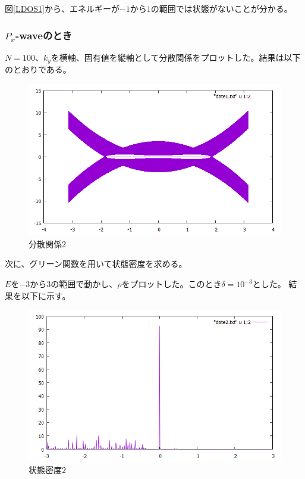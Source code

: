 \documentclass{jsarticle}
\begin{document}
            図\eqref{LDOS1}から、エネルギーが$-1$から$1$の範囲では状態がないことが分かる。
    
            \subsubsection{$P_x$-waveのとき}
            $N=100$、$k_y$を横軸、固有値を縦軸として分散関係をプロットした。結果は以下のとおりである。
    
            \begin{figure}[H]
                \centering
                \includegraphics[scale=0.5]{BdG2_bry.png}
                \caption{分散関係2}
                \label{Dispersion1}
            \end{figure}
    
            次に、グリーン関数を用いて状態密度を求める。
            
            $E$を$-3$から$3$の範囲で動かし、$\rho$をプロットした。このとき$\delta=10^{-3}$とした。
            結果を以下に示す。
    
            \begin{figure}[H]
                \centering
                \includegraphics[scale=0.5]{LDOS2.png}
                \caption{状態密度2}
                \label{LDOS2}
            \end{figure}
    
\end{document}
